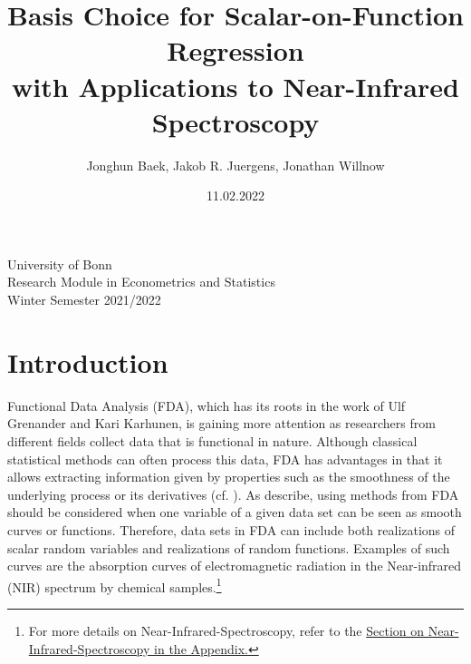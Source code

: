 \documentclass[11pt,twoside,a4paper]{article}
\begin{document}
\begin{titlepage}

	\title{{\LARGE Basis Choice for Scalar-on-Function Regression \\ with Applications to Near-Infrared Spectroscopy}}
	\author{Jonghun Baek, Jakob R. Juergens, Jonathan Willnow}
	\date{11.02.2022}
	\maketitle
	\thispagestyle{empty}
	\vspace{1.5 cm}
	\begin{center}
		University of Bonn \\
		Research Module in Econometrics and Statistics \\
		Winter Semester 2021/2022
	\end{center}
\end{titlepage}
	\newpage
	
	\tableofcontents
	
	\newpage
	
	\setlength{\abovedisplayskip}{0.35cm}
	\setlength{\belowdisplayskip}{0.35cm}

	\setlength{\abovedisplayshortskip}{0.2cm}
	\setlength{\belowdisplayshortskip}{0.35cm}

	\section{Introduction}
		
	Functional Data Analysis (FDA), which has its roots in the work of Ulf Grenander and Kari Karhunen, is gaining more attention as researchers from different fields collect data that is functional in nature. Although classical statistical methods can often process this data, FDA has advantages in that it allows extracting information given by properties such as the smoothness of the underlying process or its derivatives (cf. \cite{levitin_introduction_2007}).	As \cite{kokoszka_introduction_2017} describe, using methods from FDA should be considered when one variable of a given data set can be seen as smooth curves or functions.	 
	Therefore, data sets in FDA can include both realizations of scalar random variables and realizations of random functions. Examples of such curves are the absorption curves of electromagnetic radiation in the Near-infrared (NIR) spectrum by chemical samples.\footnote{For more details on Near-Infrared-Spectroscopy, refer to the \hyperref[NIR]{Section on Near-Infrared-Spectroscopy in the Appendix.}}
	
\end{document}
